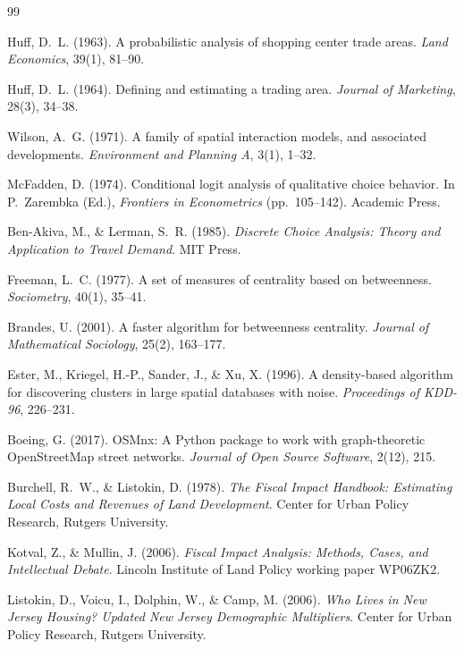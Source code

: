 \documentclass[11pt]{article}
\begin{document}
\begin{thebibliography}{99}\small

 Huff, D.~L. (1963). A probabilistic analysis of shopping
center trade areas. \emph{Land Economics}, 39(1), 81--90.

 Huff, D.~L. (1964). Defining and estimating a trading area.
\emph{Journal of Marketing}, 28(3), 34--38.

 Wilson, A.~G. (1971). A family of spatial interaction
models, and associated developments. \emph{Environment and Planning A}, 3(1),
1--32.

 McFadden, D. (1974). Conditional logit analysis of
qualitative choice behavior. In P.~Zarembka (Ed.), \emph{Frontiers in
Econometrics} (pp.~105--142). Academic Press.

 Ben-Akiva, M., \& Lerman, S.~R. (1985). \emph{Discrete
Choice Analysis: Theory and Application to Travel Demand}. MIT Press.

 Freeman, L.~C. (1977). A set of measures of centrality
based on betweenness. \emph{Sociometry}, 40(1), 35--41.

 Brandes, U. (2001). A faster algorithm for betweenness
centrality. \emph{Journal of Mathematical Sociology}, 25(2), 163--177.

 Ester, M., Kriegel, H.-P., Sander, J., \& Xu, X. (1996). A
density-based algorithm for discovering clusters in large spatial databases
with noise. \emph{Proceedings of KDD-96}, 226--231.

 Boeing, G. (2017). OSMnx: A Python package to work with
graph-theoretic OpenStreetMap street networks. \emph{Journal of Open Source
Software}, 2(12), 215.

 Burchell, R.~W., \& Listokin, D. (1978). \emph{The
Fiscal Impact Handbook: Estimating Local Costs and Revenues of Land
Development}. Center for Urban Policy Research, Rutgers University.

 Kotval, Z., \& Mullin, J. (2006). \emph{Fiscal Impact
Analysis: Methods, Cases, and Intellectual Debate}. Lincoln Institute of Land
Policy working paper WP06ZK2.

 Listokin, D., Voicu, I., Dolphin, W., \& Camp, M.
(2006). \emph{Who Lives in New Jersey Housing? Updated New Jersey Demographic
Multipliers}. Center for Urban Policy Research, Rutgers University.


\end{thebibliography}
\end{document}
